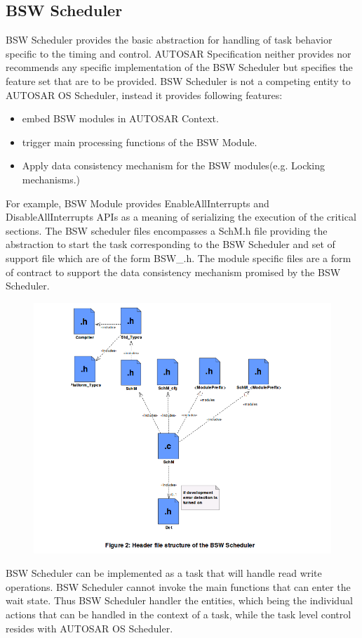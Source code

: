 \subsection{BSW Scheduler}
BSW Scheduler provides the basic abstraction for handling of task behavior specific to the timing and control.
AUTOSAR Specification neither provides nor recommends any specific implementation of the BSW Scheduler but specifies the feature set that are to be provided.
BSW Scheduler is not a competing entity to AUTOSAR OS Scheduler, instead it provides following features:
\begin{itemize}
	\item embed BSW modules in AUTOSAR Context.
	\item trigger main processing functions of the BSW Module.
	\item Apply data consistency mechanism for the BSW modules(e.g. Locking mechanisms.)
\end{itemize}
For example, BSW Module provides EnableAllInterrupts and DisableAllInterrupts APIs as a meaning of serializing the execution of the critical sections.
The BSW scheduler files encompasses a SchM.h file providing the abstraction to start the task corresponding to the BSW Scheduler and set of support file which are of the form BSW\_<Module Prefix>.h.
The module specific files are a form of contract to support the data consistency mechanism promised by the BSW Scheduler.
\begin{figure}[h]
	\includegraphics[scale = 0.5]{Pictures/BSW_Schduler.png}
\end{figure}
BSW Scheduler can be implemented as a task that will handle read write operations.
BSW Scheduler cannot invoke the main functions that can enter the wait state.
Thus BSW Scheduler handler the entities, which being the individual actions that can be handled in the context of a task, while the task level control resides with AUTOSAR OS Scheduler.
